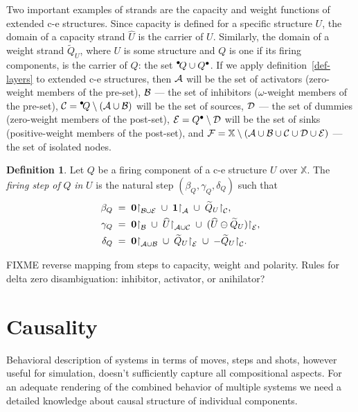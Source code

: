 \documentclass [a4paper,12pt] {article}
\theoremstyle{definition}
\newtheorem{definition}{Definition}[section]
\newcommand{\Qed}{}
\DeclareRobustCommand{\Qed}{\tag*{\qed}}
\newcommand{\preset}[1]{\prescript{\bullet}{}{\!#1}}
\newcommand{\postset}[1]{#1^{\bullet}}
\begin{document}
Two important examples of strands are the capacity and weight
functions of extended c-e structures.  Since capacity is defined for a
specific structure $U$, the domain of a capacity strand $\widehat{U}$
is the carrier of $U$.  Similarly, the domain of a weight strand
$\widetilde{Q}_U$, where $U$ is some structure and $Q$ is one if its
firing components, is the carrier of $Q$: the set $\preset{Q} \cup
\postset{Q}$.  If we apply definition~\ref{def-layers} to extended c-e
structures, then ${\cal A}$ will be the set of activators (zero-weight
members of the pre-set), ${\cal B}$ --- the set of inhibitors
($\omega$-weight members of the pre-set), ${\cal C} = \preset{Q}
\setminus ({\cal A}\cup{\cal B})$ will be the set of sources, ${\cal
  D}$ --- the set of dummies (zero-weight members of the post-set),
${\cal E} = \postset{Q}\setminus {\cal D}$ will be the set of sinks
(positive-weight members of the post-set), and ${\cal F}={\mathbb
  X}\setminus({\cal A}\cup{\cal B}\cup{\cal C}\cup{\cal D}\cup{\cal
  E})$ --- the set of isolated nodes.

\begin {definition}\label{def-step-of-fc}
  Let $Q$ be a firing component of a c-e structure $U$ over ${\mathbb
    X}$.  The {\em firing step of}\/ $Q$ {\em in}\/ $U$ is the natural
  step $(\beta_Q, \gamma_Q, \delta_Q)$ such that
\begin {align*}
  \beta_Q &\;=\; \bm{0}{\restriction}_{{\cal B} \cup {\cal E}}
  \;\cup\; \bm{1}{\restriction}_{\cal A} \;\cup\;
  \widetilde{Q}_U{\restriction}_{\cal C},\\
  \gamma_Q &\;=\; \bm{0}{\restriction}_{\cal B} \;\cup\;
  \widehat{U}{\restriction}_{{\cal A} \cup {\cal C}} \;\cup\;
  (\widehat{U} \ominus \widetilde{Q}_U){\restriction}_{\cal E},\\
  \delta_Q &\;=\; \bm{0}{\restriction}_{{\cal A} \cup {\cal B}} \;\cup\;
  \widetilde{Q}_U{\restriction}_{\cal E} \;\cup\;
  -\widetilde{Q}_U{\restriction}_{\cal C}.\Qed
\end {align*}
\end {definition}

FIXME reverse mapping from steps to capacity, weight and polarity.
Rules for delta zero disambiguation: inhibitor, activator, or
anihilator?

\section {Causality}

Behavioral description of systems in terms of moves, steps and shots,
however useful for simulation, doesn't sufficiently capture all
compositional aspects.  For an adequate rendering of the combined
behavior of multiple systems we need a detailed knowledge about causal
structure of individual components.
\end{document}
